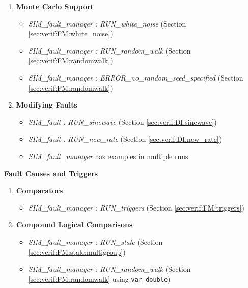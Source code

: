 \documentclass[11pt,fleqn]{report}
\begin{document}
\begin{flushleft}
\begin{enumerate}
\begin{itemize}
     \item using \textit{enabled} flag directly:
      \begin{itemize}
       \item \textit{SIM\_fault : RUN\_disable\_*}
         (Section \ref{sec:verif:DI:disable})
      \end{itemize}
    \end{itemize}

   \item \textbf{Monte Carlo Support}
    \begin{itemize}
     \item \textit{SIM\_fault\_manager : RUN\_white\_noise}
       (Section \ref{sec:verif:FM:white_noise})
     \item \textit{SIM\_fault\_manager : RUN\_random\_walk}
       (Section \ref{sec:verif:FM:randomwalk})
     \item \textit{SIM\_fault\_manager : ERROR\_no\_random\_seed\_specified}
       (Section \ref{sec:verif:FM:randomwalk})
    \end{itemize}

   \item \textbf{Modifying Faults}
    \begin{itemize}
     \item \textit{SIM\_fault : RUN\_sinewave}
       (Section \ref{sec:verif:DI:sinewave})
     \item \textit{SIM\_fault : RUN\_new\_rate}
       (Section \ref{sec:verif:DI:new_rate})
     \item \textit{SIM\_fault\_manager} has examples in multiple runs.
    \end{itemize}
  \end{enumerate}

 \item \textbf{Fault Causes and Triggers}
  \begin{enumerate}
   \item \textbf{Comparators}
    \begin{itemize}
     \item \textit{SIM\_fault\_manager : RUN\_triggers}
       (Section \ref{sec:verif:FM:triggers})
    \end{itemize}

   \item \textbf{Compound Logical Comparisons}
    \begin{itemize}
     \item \textit{SIM\_fault\_manager : RUN\_stale}
       (Section \ref{sec:verif:FM:stale:multigroup})
     \item \textit{SIM\_fault\_manager : RUN\_random\_walk}
       (Section \ref{sec:verif:FM:randomwalk} using \verb'var_double')
    \end{itemize}


\end{enumerate}
\end{flushleft}
\end{document}

